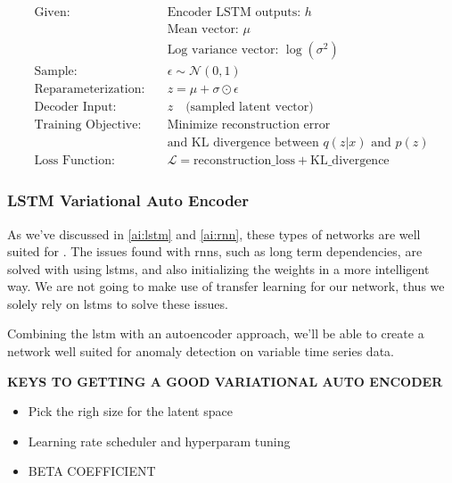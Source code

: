 \begin{align*}
\text{Given:} & \quad \text{Encoder LSTM outputs: } h \\
& \quad \text{Mean vector: } \mu \\
& \quad \text{Log variance vector: } \log(\sigma^2) \\
\text{Sample:} & \quad \epsilon \sim \mathcal{N}(0, 1) \\
\text{Reparameterization:} & \quad z = \mu + \sigma \odot \epsilon \\
\text{Decoder Input:} & \quad z \quad \text{(sampled latent vector)} \\
\text{Training Objective:} & \quad \text{Minimize reconstruction error} \\
& \quad \text{and KL divergence between } q(z|x) \text{ and } p(z) \\
\text{Loss Function:} & \quad \mathcal{L} = \text{reconstruction\_loss} + \text{KL\_divergence}
\end{align*}




\subsubsection{LSTM Variational Auto Encoder}

As we've discussed in \ref{ai:lstm} and \ref{ai:rnn}, these types of networks are well suited for . The issues found with \acrshort{rnn}s, such as long term dependencies, are solved with using \acrshort{lstm}s, and also initializing the weights in a more intelligent way. We are not going to make use of transfer learning for our network, thus we solely rely on \acrshort{lstm}s to solve these issues.

Combining the \acrshort{lstm} with an autoencoder approach, we'll be able to create a network well suited for anomaly detection on variable time series data.

\textbf{KEYS TO GETTING A GOOD VARIATIONAL AUTO ENCODER}

\begin{itemize}
    \item Pick the righ size for the latent space
    \item Learning rate scheduler  and hyperparam tuning 
    \item BETA COEFFICIENT
\end{itemize}